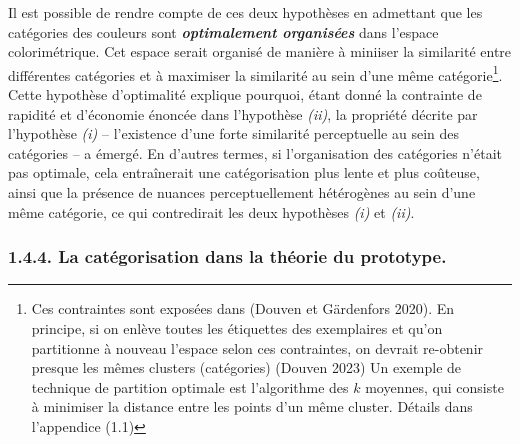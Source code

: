 \documentclass{article}
\newcommand{\bolditalic}[1]{\textbf{\textit{#1}}}
\begin{document}
Il est possible de rendre compte de ces deux hypothèses en admettant que les catégories des couleurs sont \bolditalic{optimalement organisées} dans l'espace colorimétrique. Cet espace serait organisé de manière à miniiser la similarité entre différentes catégories et à maximiser la similarité au sein d'une même catégorie\footnote{Ces contraintes sont exposées dans (Douven et Gärdenfors 2020). En principe, si on enlève toutes les étiquettes des exemplaires et qu’on partitionne à nouveau l'espace selon ces contraintes, on devrait re-obtenir presque les mêmes clusters (catégories) (Douven 2023) Un exemple de technique de partition optimale est l’algorithme des $k$ moyennes, qui consiste à minimiser la distance entre les points d’un même cluster. Détails dans l’appendice (1.1)}. Cette hypothèse d’optimalité explique pourquoi, étant donné la contrainte de rapidité et d’économie énoncée dans l’hypothèse \textit{(ii)}, la propriété décrite par l’hypothèse \textit{(i)} -- l’existence d’une forte similarité perceptuelle au sein des catégories -- a émergé. En d’autres termes, si l’organisation des catégories n’était pas optimale, cela entraînerait une catégorisation plus lente et plus coûteuse, ainsi que la présence de nuances perceptuellement hétérogènes au sein d’une même catégorie, ce qui contredirait les deux hypothèses \textit{(i)} et \textit{(ii)}.

\subsubsection*{1.4.4. 	La catégorisation dans la théorie du prototype.}
\end{document}
